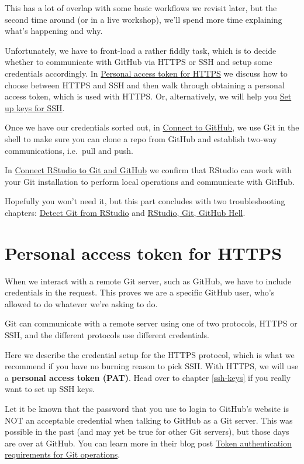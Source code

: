 \documentclass[
]{book}
\begin{document}
This has a lot of overlap with some basic workflows we revisit later, but the second time around (or in a live workshop), we'll spend more time explaining what's happening and why.

Unfortunately, we have to front-load a rather fiddly task, which is to decide whether to communicate with GitHub via HTTPS or SSH and setup some credentials accordingly.
In \hyperref[https-pat]{Personal access token for HTTPS} we discuss how to choose between HTTPS and SSH and then walk through obtaining a personal access token, which is used with HTTPS.
Or, alternatively, we will help you \hyperref[ssh-keys]{Set up keys for SSH}.

Once we have our credentials sorted out, in \hyperref[push-pull-github]{Connect to GitHub}, we use Git in the shell to make sure you can clone a repo from GitHub and establish two-way communications, i.e.~pull and push.

In \hyperref[rstudio-git-github]{Connect RStudio to Git and GitHub} we confirm that RStudio can work with your Git installation to perform local operations and communicate with GitHub.

Hopefully you won't need it, but this part concludes with two troubleshooting chapters: \hyperref[rstudio-see-git]{Detect Git from RStudio} and \hyperref[troubleshooting]{RStudio, Git, GitHub Hell}.

\chapter{Personal access token for HTTPS}\label{https-pat}

When we interact with a remote Git server, such as GitHub, we have to include credentials in the request.
This proves we are a specific GitHub user, who's allowed to do whatever we're asking to do.

Git can communicate with a remote server using one of two protocols, HTTPS or SSH, and the different protocols use different credentials.

Here we describe the credential setup for the HTTPS protocol, which is what we recommend if you have no burning reason to pick SSH.
With HTTPS, we will use a \textbf{personal access token (PAT)}.
Head over to chapter \ref{ssh-keys} if you really want to set up SSH keys.

Let it be known that the password that you use to login to GitHub's website is NOT an acceptable credential when talking to GitHub as a Git server.
This was possible in the past (and may yet be true for other Git servers), but those days are over at GitHub.
You can learn more in their blog post \href{https://github.blog/2020-12-15-token-authentication-requirements-for-git-operations/}{Token authentication requirements for Git operations}.
\end{document}
